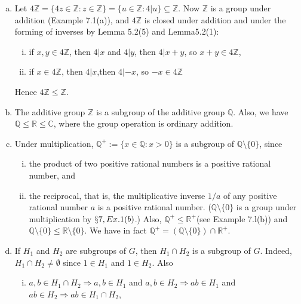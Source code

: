 \documentclass{article}
\begin{document}
    \begin{enumerate}[(a)]
        \item Let $4\mathbb{Z}=\{4z \in \mathbb{Z}: z \in \mathbb{Z}\}=\{u \in \mathbb{Z}: 4|u\} \subseteq \mathbb{Z}$. Now $\mathbb{Z}$ is a group under addition (Example 7.1(a)), and $4\mathbb{Z}$ is closed under addition and under the forming of inverses by Lemma 5.2(5) and Lemma5.2(1):
        \begin{enumerate}[(i)]
            \item if $x,y \in 4\mathbb{Z}$, then $4|x$ and $4|y$, then $4|x+y$, so $x+y \in 4\mathbb{Z}$,
            \item if $x \in 4\mathbb{Z}$, then $4|x$,then $4|-x$, so $-x \in 4\mathbb{Z}$
        \end{enumerate}
        Hence $4\mathbb{Z} \leqslant \mathbb{Z}$.
        \item The additive group $\mathbb{Z}$ is a subgroup of the additive group $\mathbb{Q}$. Also, we have $\mathbb{Q} \leqslant \mathbb{R} \leqslant \mathbb{C}$, where the group operation is ordinary addition.
        \item Under multiplication, $\mathbb{Q}^{+}:=\{x \in \mathbb{Q} :x>0\}$ is a subgroup of $\mathbb{Q}\setminus \{0\}$, since
        \begin{enumerate}[(i)]
            \item the product of two positive rational numbers is a positive rational number, and
            \item the reciprocal, that is, the multiplicative inverse $1/a$ of any positive rational number $a$ is a positive rational number. ($\mathbb{Q}\setminus\{0\}$ is a group under multiplication by $\mathsection7,Ex.1(b)$.) Also, $\mathbb{Q}^{+} \leqslant \mathbb{R}^{+}$(see Example 7.l(b)) and $\mathbb{Q}\setminus\{0\} \leqslant \mathbb{R}\setminus\{0\}$. We have in fact $\mathbb{Q}^{+}=(\mathbb{Q}\setminus\{0\})\cap\mathbb{R}^{+}$.
        \end{enumerate}
        \item If $H_{1}$ and $H_{2}$ are subgroups of $G$, then $H_{1} \cap H_{2}$ is a subgroup of $G$. Indeed, $H_{1} \cap H_{2} \ne \emptyset$ since $1\in H_{1}$ and $1\in H_{2}$. Also
        \begin{enumerate}[(i)]
            \item $a,b \in H_{1} \cap H_{2}  \Longrightarrow a,b \in H_{1}$ and $a,b \in H_{2} \Longrightarrow ab \in H_{1}$ and $ab \in H_{2} \Longrightarrow ab \in H_{1} \cap H_{2}$,

\end{enumerate}
\end{enumerate}
\end{document}
